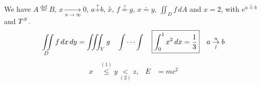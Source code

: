 \documentclass{article}
\begin{document}
We have $A \overset{\text{def}}{=} B$, $x \underset{n\to\infty}{\longrightarrow} 0$, $a \overset{*}{+} b$, $\overset{\circ}{x}$,
$f \stackrel{?}{=} g$, $x\doteq y$, $\iint_D f\,dA$ and $\boxed{x = 2}$, with $e^{a\overset{1}{=}b}$ and $\mathchoice{D}{T}{S}{SS}^{\mathchoice{D}{T}{S}{SS}}$.
\[ \iint\limits_{D} f \, dx\,dy = \iiint_V g \quad \idotsint \quad \boxed{\int_0^1 x^2\,dx = \frac{1}{3}} \quad a\overunderset{u}{l}{\to} b \]
\begin{align}
  x &\overset{(1)}{\le} y \underset{(2)}{<} z, & E &= \boxed{mc^2}
\end{align}
\end{document}
